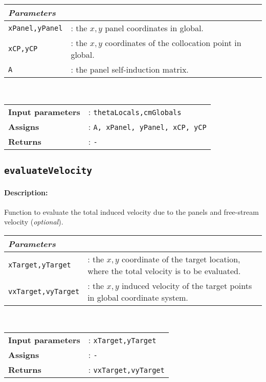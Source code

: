 		\begin{tabular}{lp{10cm}}
			\textit{Parameters} & \\ \hline
			\texttt{xPanel,yPanel} &: the $x,y$ panel coordinates in global.\\
			\texttt{xCP,yCP} &: the $x,y$ coordinates of the collocation point in global.\\
			\texttt{A} &: the panel self-induction matrix.
		\end{tabular} \vspace{5 mm}
		\\		
		\begin{tabular}{lp{10cm}}
			\textbf{Input parameters} &: \texttt{thetaLocals,cmGlobals}\\ 
			\textbf{Assigns} &: \texttt{A, xPanel, yPanel, xCP, yCP}\\ 			
			\textbf{Returns} &: \texttt{-}\\ 					
		\end{tabular}	

\subsection{\texttt{evaluateVelocity}}
	\paragraph{Description:} Function to evaluate the total induced velocity due to the panels and free-stream velocity (\textit{optional}).\\
	
	    \begin{tabular}{lp{10cm}}
			\textit{Parameters} & \\ \hline
			 \texttt{xTarget,yTarget} &: the $x,y$ coordinate of the target location, where the total velocity is to be evaluated.\\
			\texttt{vxTarget,vyTarget} &: the $x,y$ induced velocity of the target points in global coordinate system.\\
		\end{tabular} \vspace{5 mm}
	\\		
	\begin{tabular}{lp{10cm}}
		\textbf{Input parameters} &: \texttt{xTarget,yTarget}\\ 
		\textbf{Assigns} &: \texttt{-}\\ 			
		\textbf{Returns} &: \texttt{vxTarget,vyTarget}\\ 					
	\end{tabular}					

